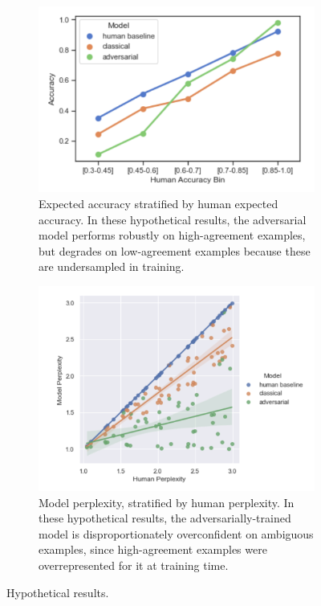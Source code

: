 \documentclass[10pt,a4paper]{article}
\begin{document}
\begin{figure}[t!]
\centering
\begin{subfigure}[b]{0.48\textwidth}
\includegraphics[width=\textwidth]{images/acc.png}
\caption{Expected accuracy stratified by human expected accuracy. In these hypothetical results, the adversarial model performs robustly on high-agreement examples, but degrades on low-agreement examples because these are undersampled in training.\label{fig:accuracy}}

\end{subfigure}
\hfill
\begin{subfigure}[b]{0.48\textwidth}
\includegraphics[width=\textwidth]{images/ppl.png}

\caption{Model perplexity, stratified by human perplexity. In these hypothetical results, the adversarially-trained model is disproportionately overconfident on ambiguous examples, since high-agreement examples were overrepresented for it at training time.\label{fig:perplexity}}
\end{subfigure}
\caption{Hypothetical results.\label{fig:mock-graphs}}
\end{figure}
\end{document}
